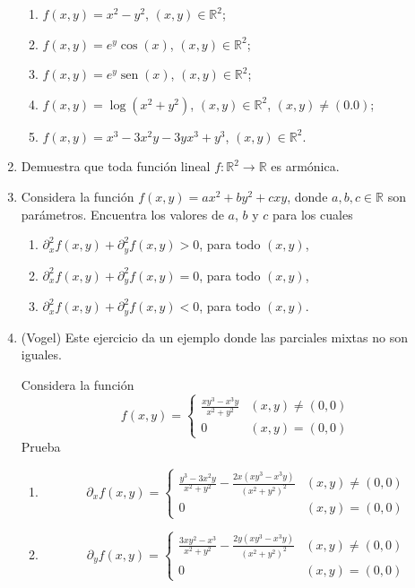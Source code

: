 \documentclass{article}
\theoremstyle{definition}
\newcommand{\sen}{\operatorname{sen}}
\begin{document}
\begin{enumerate}
       
    \begin{enumerate}
    \item $f(x,y)=x^2-y^2$, $(x,y)\in \mathbb{R}^2$;
    \item $f(x,y)=e^y\cos(x)$, $(x,y)\in \mathbb{R}^2$; 
    \item $f(x,y)=e^y\sen(x)$, $(x,y)\in \mathbb{R}^2$;
    \item $f(x,y)=\log(x^2+y^2)$,
      $(x,y)\in \mathbb{R}^2$, $(x,y)\ne (0.0)$;
    \item $f(x,y)=x^3-3x^2y-3yx^3+y^3$, $(x,y)\in \mathbb{R}^2$.
    \end{enumerate}		       

  \item Demuestra que toda funci\'on
    lineal $f:\mathbb{R}^2\to \mathbb{R}$ es arm\'onica.
    
                
  \item Considera la funci\'on $f(x,y)=ax^2+by^2+cxy$,
    donde $a,b,c\in \mathbb{R}$ son par\'ametros. Encuentra
    los valores de $a$, $b$ y $c$ para los cuales
    \begin{enumerate}
    \item $\partial_x^2 f(x,y)+\partial_y^2f(x,y) >0$, para todo $(x,y)$,
    \item $\partial_x^2f(x,y)+\partial_y^2f(x,y)=0$, para todo $(x,y)$,
    \item $\partial_x^2f(x,y)+\partial_y^2f(x,y)<0$, para todo $(x,y)$.
    \end{enumerate}
                  
 
    
  \item (Vogel) Este ejercicio da un ejemplo
    donde las parciales mixtas no son iguales.

    Considera la funci\'on
    $$
    f(x,y)=\left\{
      \begin{array}{cc}
        \frac{xy^3-x^3y}{x^2+y^2} & (x,y)\ne (0,0)\\
        0 & (x,y)=(0,0)
      \end{array}
    \right.
    $$
    Prueba
    \begin{enumerate}
    \item
      $$
      \partial_xf(x,y)=\left\{
        \begin{array}{cc}
          \frac{y^3-3x^2y}{x^2+y^2}- \frac{2x(xy^3-x^3y)}{(x^2+y^2)^2}
          & (x,y)\ne (0,0)\\
          0 & (x,y)=(0,0)
        \end{array}
      \right.
      $$
    \item
      $$
      \partial_y f(x,y)=\left\{
        \begin{array}{cc}
          \frac{3xy^2-x^3}{x^2+y^2}- \frac{2y(xy^3-x^3y)}{(x^2+y^2)^2}
          & (x,y)\ne (0,0)\\
          0 & (x,y)=(0,0)
        \end{array}
      \right.
      $$
      

\end{enumerate}
\end{enumerate}
\end{document}
